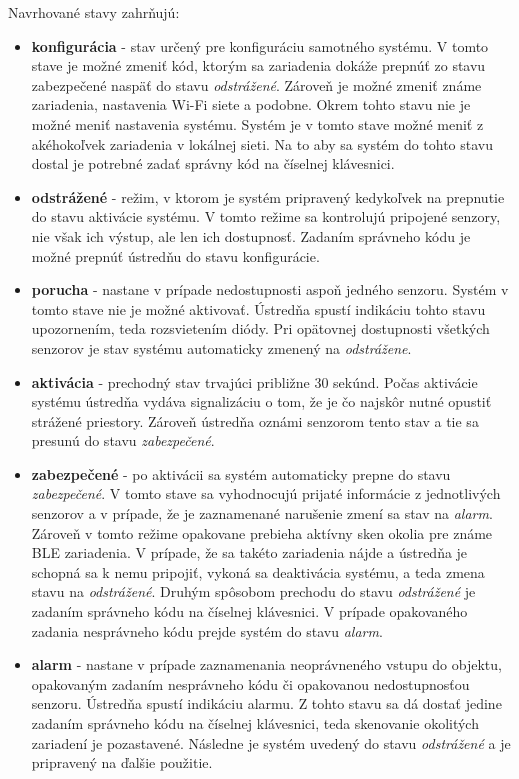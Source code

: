 \noindent Navrhované stavy zahrňujú:

\begin{itemize}
    \item \textbf{konfigurácia} - stav určený pre konfiguráciu samotného systému. V tomto stave je možné zmeniť kód, ktorým sa zariadenia dokáže prepnúť zo stavu zabezpečené naspäť do stavu \textit{odstrážené}. Zároveň je možné zmeniť známe zariadenia, nastavenia Wi-Fi siete a podobne. Okrem tohto stavu nie je možné meniť nastavenia systému. Systém je v tomto stave možné meniť z akéhokoľvek zariadenia v lokálnej sieti. Na to aby sa systém do tohto stavu dostal je potrebné zadať správny kód na číselnej klávesnici.
    \item \textbf{odstrážené} - režim, v ktorom je systém pripravený kedykoľvek na prepnutie do stavu aktivácie systému. V tomto režime sa kontrolujú pripojené senzory, nie však ich výstup, ale len ich dostupnosť. Zadaním správneho kódu je možné prepnúť ústredňu do stavu konfigurácie.
    \item \textbf{porucha} - nastane v prípade nedostupnosti aspoň jedného senzoru. Systém v tomto stave nie je možné aktivovať. Ústredňa spustí indikáciu tohto stavu upozornením, teda rozsvietením diódy. Pri opätovnej dostupnosti všetkých senzorov je stav systému automaticky zmenený na \textit{odstrážene}.
    \item \textbf{aktivácia} - prechodný stav trvajúci približne 30 sekúnd. Počas aktivácie systému ústredňa vydáva signalizáciu o tom, že je čo najskôr nutné opustiť strážené priestory. Zároveň ústredňa oznámi senzorom tento stav a tie sa presunú do stavu \textit{zabezpečené}.
    \item \textbf{zabezpečené} - po aktivácii sa systém automaticky prepne do stavu \textit{zabezpečené}. V tomto stave sa vyhodnocujú prijaté informácie z jednotlivých senzorov a v prípade, že je zaznamenané narušenie zmení sa stav na \textit{alarm}. Zároveň v tomto režime opakovane prebieha aktívny sken okolia pre známe BLE zariadenia. V prípade, že sa takéto zariadenia nájde a ústredňa je schopná sa k nemu pripojiť, vykoná sa deaktivácia systému, a teda zmena stavu na \textit{odstrážené}. Druhým spôsobom prechodu do stavu \textit{odstrážené} je zadaním správneho kódu na číselnej klávesnici. V prípade opakovaného zadania nesprávneho kódu prejde systém do stavu \textit{alarm}.
    \item \textbf{alarm} - nastane v prípade zaznamenania neoprávneného vstupu do objektu, opakovaným zadaním nesprávneho kódu či opakovanou nedostupnosťou senzoru. Ústredňa spustí indikáciu alarmu. Z tohto stavu sa dá dostať jedine zadaním správneho kódu na číselnej klávesnici, teda skenovanie okolitých zariadení je pozastavené. Následne je systém uvedený do stavu \textit{odstrážené} a je pripravený na ďalšie použitie.
\end{itemize}

